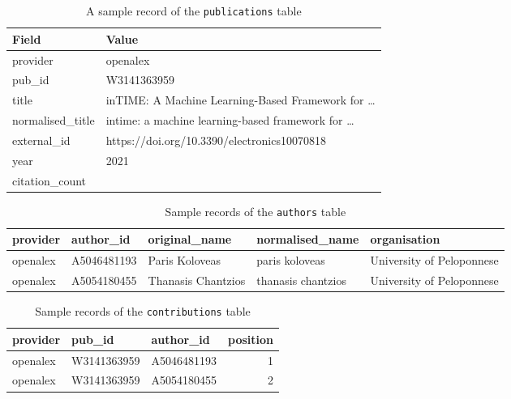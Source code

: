 \begin{table}[tb]
    \centering
    \begin{tabular}{|l|l|}
        \hline
        Field & Value \\
        \hline\hline
        provider & openalex \\
        pub\_id & W3141363959 \\
        title & inTIME: A Machine Learning-Based Framework for \dots \\
        normalised\_title & intime: a machine learning-based framework for \dots \\
        external\_id & https://doi.org/10.3390/electronics10070818 \\
        year & 2021 \\
        citation\_count & \\
        \hline
    \end{tabular}
    \caption{A sample record of the \texttt{publications} table}
    \label{tab:sample-publications}
\end{table}

\begin{table}[tb]
    \centering
    \footnotesize
    \begin{tabular}{|l|l|l|l|l|}
        \hline
        provider & author\_id & original\_name & normalised\_name & organisation \\
        \hline\hline
        openalex & A5046481193 & Paris Koloveas & paris koloveas & University of Peloponnese \\
        openalex & A5054180455 & Thanasis Chantzios & thanasis chantzios & University of Peloponnese \\
        \hline
    \end{tabular}
    \caption{Sample records of the \texttt{authors} table}
    \label{tab:sample-authors}
\end{table}

\begin{table}[tb]
    \centering
    \begin{tabular}{|l|l|l|r|}
        \hline
        provider & pub\_id & author\_id & position \\
        \hline\hline
        openalex & W3141363959 & A5046481193 & 1 \\
        openalex & W3141363959 & A5054180455 & 2 \\
        \hline
    \end{tabular}
    \caption{Sample records of the \texttt{contributions} table}
    \label{tab:sample-contributions}
\end{table}

